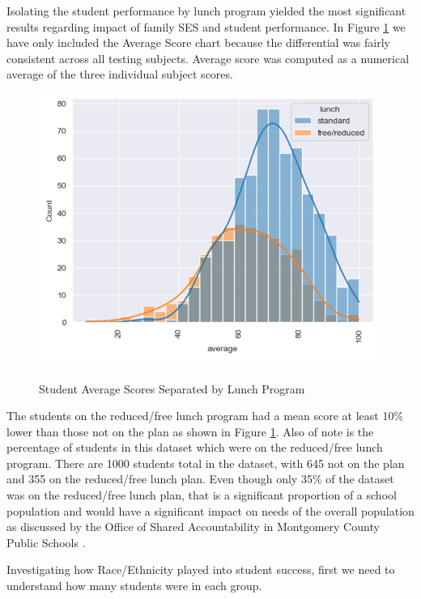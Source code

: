 \documentclass[man,floatsintext]{apa6} %
\begin{document}
Isolating the student performance by lunch program yielded the most significant results regarding impact of family SES and student performance. In Figure \ref{fig:lunch1} we have only included the Average Score chart because the differential was fairly consistent across all testing subjects. Average score was computed as a numerical average of the three individual subject scores.

\begin{figure}[H]
    \centering
    \caption{Student Average Scores Separated by Lunch Program}
    \includegraphics[width=0.75\linewidth]{StudentAvgScoresVSReducedLunch.png}
    \label{fig:lunch1}
\end{figure}
The students on the reduced/free lunch program had a mean score at least 10\% lower than those not on the plan as shown in Figure \ref{fig:lunch1}. Also of note is the percentage of students in this dataset which were on the reduced/free lunch program. There are 1000 students total in the dataset, with 645 not on the plan and 355 on the reduced/free lunch plan. Even though only 35\% of the dataset was on the reduced/free lunch plan, that is a significant proportion of a school population and would have a significant impact on needs of the overall population as discussed by the Office of Shared Accountability in Montgomery County Public Schools \cite{MCPSPoverty}.

Investigating how Race/Ethnicity played into student success, first we need to understand how many students were in each group.
\end{document}
